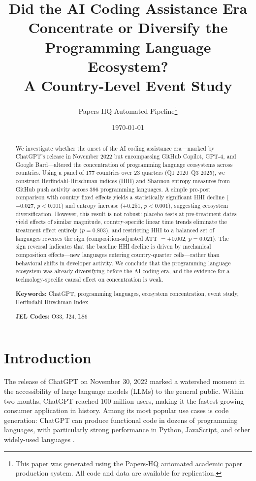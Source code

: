 \documentclass[12pt]{article}
\title{Did the AI Coding Assistance Era Concentrate or Diversify the Programming Language Ecosystem? \\ A Country-Level Event Study}
\author{
  Papers-HQ Automated Pipeline\thanks{This paper was generated using the Papers-HQ automated academic paper production system. All code and data are available for replication.}
}
\date{\today}
\begin{document}
\maketitle

\begin{abstract}
We investigate whether the onset of the AI coding assistance era---marked by ChatGPT's release in November 2022 but encompassing GitHub Copilot, GPT-4, and Google Bard---altered the concentration of programming language ecosystems across countries. Using a panel of 177 countries over 23 quarters (Q1 2020--Q3 2025), we construct Herfindahl-Hirschman indices (HHI) and Shannon entropy measures from GitHub push activity across 396 programming languages. A simple pre-post comparison with country fixed effects yields a statistically significant HHI decline ($-0.027$, $p < 0.001$) and entropy increase ($+0.251$, $p < 0.001$), suggesting ecosystem diversification. However, this result is not robust: placebo tests at pre-treatment dates yield effects of similar magnitude, country-specific linear time trends eliminate the treatment effect entirely ($p = 0.803$), and restricting HHI to a balanced set of languages reverses the sign (composition-adjusted ATT $= +0.002$, $p = 0.021$). The sign reversal indicates that the baseline HHI decline is driven by mechanical composition effects---new languages entering country-quarter cells---rather than behavioral shifts in developer activity. We conclude that the programming language ecosystem was already diversifying before the AI coding era, and the evidence for a technology-specific causal effect on concentration is weak.

\vspace{0.5em}
\noindent\textbf{Keywords:} ChatGPT, programming languages, ecosystem concentration, event study, Herfindahl-Hirschman Index

\noindent\textbf{JEL Codes:} O33, J24, L86
\end{abstract}

\clearpage

\section{Introduction}

The release of ChatGPT on November 30, 2022 \citep{openai2022chatgpt} marked a watershed moment in the accessibility of large language models (LLMs) to the general public. Within two months, ChatGPT reached 100 million users, making it the fastest-growing consumer application in history. Among its most popular use cases is code generation: ChatGPT can produce functional code in dozens of programming languages, with particularly strong performance in Python, JavaScript, and other widely-used languages \citep{chen2021evaluating}.
\end{document}
